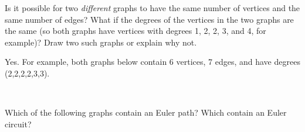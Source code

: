 \begin{questions}
	
	


\question Is it possible for two {\em different} graphs to have the same number of vertices and the same number of edges?  What if the degrees of the vertices in the two graphs are the same (so both graphs have vertices with degrees 1, 2, 2, 3, and 4, for example)?  Draw two such graphs or explain why not.

	\begin{answer}
		Yes.  For example, both graphs below contain 6 vertices, 7 edges, and have degrees (2,2,2,2,3,3).
		\begin{center}
		  \hfill
		  \hfill
		  \hfill ~
		\end{center}
	\end{answer}
	
	
	


\question Which of the following graphs contain an Euler path?  Which contain an Euler circuit?


\end{questions}
